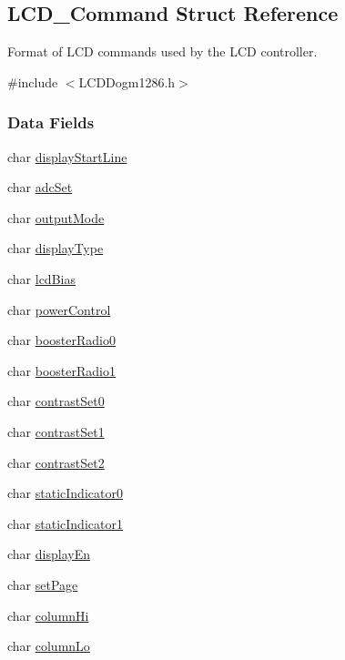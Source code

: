 \subsection{L\+C\+D\+\_\+\+Command Struct Reference}
\label{struct_l_c_d___command}


Format of L\+C\+D commands used by the L\+C\+D controller.  




{\ttfamily \#include $<$L\+C\+D\+Dogm1286.\+h$>$}

\subsubsection*{Data Fields}
\begin{DoxyCompactItemize}
\item 
char \hyperlink{struct_l_c_d___command_ae4fbd8142bd9ee7b42020251b036efe6}{display\+Start\+Line}
\item 
char \hyperlink{struct_l_c_d___command_a13174f610535ad591df48139b2e4c511}{adc\+Set}
\item 
char \hyperlink{struct_l_c_d___command_afe9d8a469e345bcbf35cfe14e5184eb4}{output\+Mode}
\item 
char \hyperlink{struct_l_c_d___command_a795b45502f9138dfc6486297cd14628b}{display\+Type}
\item 
char \hyperlink{struct_l_c_d___command_a1ccb63cfbfab6ef7627a1951640ddbd4}{lcd\+Bias}
\item 
char \hyperlink{struct_l_c_d___command_a988a63f9ff8ca32ab6952c097de3e5a7}{power\+Control}
\item 
char \hyperlink{struct_l_c_d___command_a9f62631a5984e53bf96647e1ce68c25c}{booster\+Radio0}
\item 
char \hyperlink{struct_l_c_d___command_a05a53c0a6c81f5db5438695b14c2f9a8}{booster\+Radio1}
\item 
char \hyperlink{struct_l_c_d___command_a37382a7a2ddbd5ccdd3ee1db887bb50d}{contrast\+Set0}
\item 
char \hyperlink{struct_l_c_d___command_aa031605824fe2c5e283c8bcd7f27e9db}{contrast\+Set1}
\item 
char \hyperlink{struct_l_c_d___command_af26bfd125db7aef96ce618bc31181a23}{contrast\+Set2}
\item 
char \hyperlink{struct_l_c_d___command_a5b301143d4a24deb3946fd6a23b46b3e}{static\+Indicator0}
\item 
char \hyperlink{struct_l_c_d___command_af42f170bac9dfd5edfcf2a9f8b940525}{static\+Indicator1}
\item 
char \hyperlink{struct_l_c_d___command_ad5e77eb483dec8e803653904047f2945}{display\+En}
\item 
char \hyperlink{struct_l_c_d___command_a0e0aeb304cfae0c5af8ec43c3c8daa50}{set\+Page}
\item 
char \hyperlink{struct_l_c_d___command_a53634dafcc4b7694da1dbfa351b3986e}{column\+Hi}
\item 
char \hyperlink{struct_l_c_d___command_adaf735a3cc75a92e5b8bbc51d7bf2975}{column\+Lo}
\end{DoxyCompactItemize}


